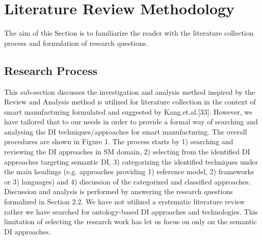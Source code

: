 \section{Literature Review Methodology}
\label{sec:litRevMethod}
\vspace{-.3cm}
The aim of this Section is to familiarize the reader with the literature collection process and formulation of research questions.
\subsection{Research Process}
This sub-section discusses the investigation and analysis method inspired by the
Review and Analysis method is utilized for literature collection in the
context of smart manufacturing formulated and suggested by Kang.et.al.[33].
However, we have tailored that to our needs in order to provide a formal way of searching and analysing the DI techniques/approaches for smart manufacturing. 
The overall procedures are shown in Figure 1. 
The process starts by 1) searching and reviewing the DI approaches in SM domain, 2) selecting from the identified DI approaches targeting semantic DI, 3) categorizing the identified techniques under the main headings (e.g. approaches providing 1) reference model, 2) frameworks or 3) languages) and 4) discussion of the categorized and classified approaches. 
Discussion and analysis is performed by answering the research questions formalized in Section 2.2. 
We have not utilized a systematic literature review rather we have searched for ontology-based DI approaches and technologies. 
This limitation of selecting the research work has let us focus on only on the semantic DI approaches.
